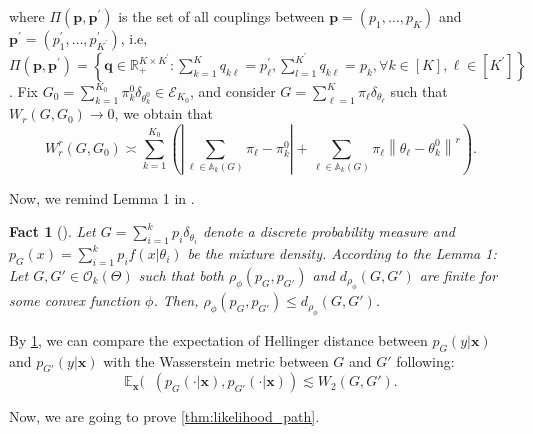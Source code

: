 \documentclass[twoside]{article}
\DeclareMathOperator*{\hels}{D_{h}^2}
\theoremstyle{plain}
\newtheorem{fact}{Fact}
\theoremstyle{definition}
\theoremstyle{plain}
\def\rvx{{\mathbf{x}}}
\def\vp{{\bm{p}}}
\def\vq{{\bm{q}}}
\def\vx{{\bm{x}}}
\def\sA{{\mathbb{A}}}
\newcommand{\bbE}{\mathbb{E}}
\begin{document}
where $\Pi\left(\vp, \vp^{\prime}\right)$ is the set of all couplings between $\vp=\left(p_{1}, \ldots, p_{K}\right)$ and $\vp^{\prime}=\left(p_{1}^{\prime}, \ldots, p_{K^{\prime}}^{\prime}\right)$, i.e, $\Pi\left(\vp, \vp^{\prime}\right)=\left\{\vq \in \mathbb{R}_{+}^{K \times K^{\prime}}: \sum_{k=1}^{K} q_{k \ell}=p_{\ell}^{\prime}, \sum_{l=1}^{K^{\prime}} q_{k \ell}=p_{k}, \forall k \in[K], \ell \in\left[K^{\prime}\right]\right\}$. Fix $G_{0}=\sum_{k=1}^{K_{0}} \pi_{k}^{0} \delta_{\theta_{k}^{0}} \in \mathcal{E}_{K_{0}}$, and consider $G=\sum_{\ell=1}^{K} \pi_{\ell} \delta_{\theta_{\ell}}$ such that $W_{r}\left(G, G_{0}\right) \rightarrow 0$, we obtain that
\[
W_{r}^{r}\left(G, G_{0}\right) \asymp \sum_{k=1}^{K_{0}}\left(\left|\sum_{\ell \in \sA_{k} (G)} \pi_{\ell}-\pi_{k}^{0}\right|+\sum_{\ell \in \sA_{k} (G)} \pi_{\ell}\left\|\theta_{\ell}-\theta_{k}^{0}\right\|^{r}\right).
\]

Now, we remind Lemma 1 in \citet{ho_convergence_2016}.
\begin{fact}[{\citealp[Lemma 1]{ho_convergence_2016}}]\label{lem:compare_hellinger}
    Let $G = \sum_{i = 1}^k p_i \delta_{\theta_i}$ denote a discrete probability measure and $p_G (x) = \sum_{i = 1}^k p_i f(x | \theta_i)$ be the mixture density. According to the Lemma 1: Let $G, G' \in \mathcal{O}_k (\Theta)$ such that both $\rho_{\phi} (p_G, p_{G'})$ and $d_{\rho_{\phi}} (G, G')$ are finite for some convex function $\phi$. Then, $\rho_{\phi} (p_G, p_{G'}) \leq d_{\rho_{\phi}} (G, G')$.
\end{fact}

By \cref{lem:compare_hellinger}, we can compare the expectation of Hellinger distance between $p_{G} (y | \vx)$ and $p_{G'} (y | \vx)$ with the Wasserstein metric between $G$ and $G'$ following: $$\bbE_{\rvx} (\hels(p_{G} (\cdot | \vx), p_{G'} (\cdot | \vx)) \lesssim W_2 (G, G').$$

Now, we are going to prove \cref{thm:likelihood_path}. 
\end{document}
